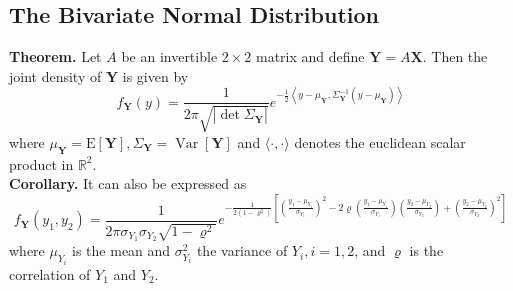 \documentclass[a4paper,12pt]{article}
\begin{document}
    \subsection{The Bivariate Normal Distribution}
    \textbf{Theorem.} Let $A$ be an invertible $2 \times 2$ matrix and define $\boldsymbol{Y}=A \boldsymbol{X}$. Then the joint density of $\boldsymbol{Y}$ is given by
$$
f_{\boldsymbol{Y}}(y)=\frac{1}{2 \pi \sqrt{\left|\operatorname{det} \Sigma_{\boldsymbol{Y}}\right|}} e^{-\frac{1}{2}\left\langle y-\mu_{\boldsymbol{Y}}, \Sigma_{\boldsymbol{Y}}^{-1}\left(y-\mu_{\boldsymbol{Y}}\right)\right\rangle}
$$
where $\mu_{\boldsymbol{Y}}=\mathrm{E}[\boldsymbol{Y}], \Sigma_{\boldsymbol{Y}}=\operatorname{Var}[\boldsymbol{Y}]$ and $\langle\cdot, \cdot\rangle$ denotes the euclidean scalar product in $\mathbb{R}^2$.
\\
\textbf{Corollary.} It can also be expressed as 
$$
    f_{\boldsymbol{Y}}\left(y_1, y_2\right)=\frac{1}{2 \pi \sigma_{Y_1} \sigma_{Y_2} \sqrt{1-\varrho^2}} e^{-\frac{1}{2\left(1-\varrho^2\right)}\left[\left(\frac{y_1-\mu_{Y_1}}{\sigma_{Y_1}}\right)^2-2 \varrho\left(\frac{y_1-\mu_{Y_1}}{\sigma_{Y_1}}\right)\left(\frac{y_2-\mu_{Y_2}}{\sigma_{Y_2}}\right)+\left(\frac{y_2-\mu_{Y_2}}{\sigma_{Y_2}}\right)^2\right]}
$$
where $\mu_{Y_i}$ is the mean and $\sigma_{Y_i}^2$ the variance of $Y_i, i=1,2$, and $\varrho$ is the correlation of $Y_1$ and $Y_2$.
\end{document}
